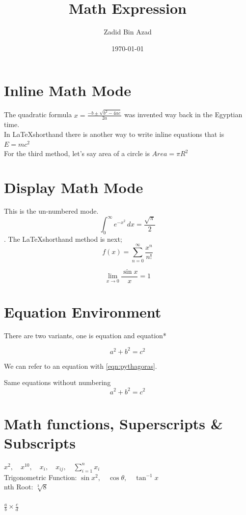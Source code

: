 \documentclass[17pt]{extarticle}
\title{Math Expression}
\author{Zadid Bin Azad}
\date{\today}
\begin{document}
\maketitle
\newpage

\section{Inline Math Mode}

The quadratic formula \(x= \frac{-b \pm \sqrt{b^2-4ac}}{2a}\) was invented way back in the Egyptian time.
\\
In \LaTeX shorthand there is another way to write inline equations that is $E = mc^2$
\\
For the third method, let's say area of a circle is \begin{math}
Area = \pi R^2
\end{math}

\section{Display Math Mode}
This is the un-numbered mode.
\[\int_0^\infty e^{-x^2}\,dx = \frac{\sqrt{\pi}}{2}\]
.
The \LaTeX shorthand method is next; 
$$
f(x) = \sum_{n=0}^{\infty} \frac{x^n}{n!}
$$

\begin{displaymath}
\lim_{x \to 0} \frac{\sin x}{x} = 1
\end{displaymath}

\section{Equation Environment}
There are two variants, one is equation and equation*

\begin{equation} \label{eqn:pythagoras}
    a^2 + b^2 = c^2
\end{equation}

We can refer to an equation with \autoref{eqn:pythagoras}.

Same equations without numbering
\begin{equation*}
    a^2 + b^2 = c^2
\end{equation*}


\section{Math functions, Superscripts \& Subscripts}
$x^2,\quad x^{10}, \quad x_i, \quad x_{ij}, \quad \sum_{i=1}^{n} x_i$ 
\\
Trigonometric Function:
$\sin{x^2}, \quad \cos{\theta},\quad \tan^{-1}{x}$
\\
nth Root:
$\sqrt[3]{8}$
\\
\\
$\frac{a}{b} \times \frac{c}{d}$
\end{document}
